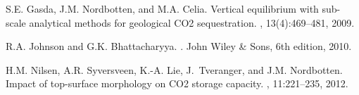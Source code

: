 \documentclass[11pt,a4paper]{amsart}
\newenvironment{ovpc}[2]{\begin{overpic}[width=#1\textwidth]{../fig/#2}}{\end{overpic}}
\begin{document}

\begin{thebibliography}{1}

S.E. Gasda, J.M. Nordbotten, and M.A. Celia.
\newblock Vertical equilibrium with sub-scale analytical methods for geological
  {CO2} sequestration.
, 13(4):469--481, 2009.

R.A. Johnson and G.K. Bhattacharyya.
.
\newblock John Wiley \& Sons, 6th edition, 2010.

H.M. Nilsen, A.R. Syversveen, K.-A. Lie, J.~Tveranger, and J.M. Nordbotten.
\newblock Impact of top-surface morphology on {CO2} storage capacity.
, 11:221--235,
  2012.

\end{thebibliography}
\end{document}
